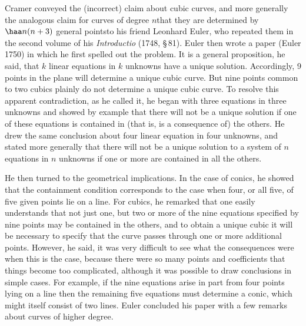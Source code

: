 Cramer conveyed the (incorrect) claim about cubic curves, and more generally the analogous claim for curves of degree $n$\emdash  that they are determined by $\haa n(n+3)$ general points\emdash  to his friend Leonhard Euler, who repeated  them in the second volume of his \emph{Introductio} (1748, \S\,81). Euler then wrote a paper (Euler 1750) in which he first spelled out the problem. It is a general proposition, he said, that $k$ linear equations in $k$ unknowns have a unique solution. Accordingly, 9 points in the plane will determine a unique cubic curve. But nine points common to two cubics plainly do not determine a unique cubic curve. To resolve this apparent contradiction, as he called it, he began with  three equations in three unknowns and showed by example that there will not be a unique solution if one of these equations is contained in (that is, is a consequence of) the others. He drew the same conclusion about four linear equation in four unknowns, and stated more generally that there will not be a unique solution to a system of $n$ equations in $n$ unknowns if one or more are contained in all the others. 

He then turned to the geometrical implications. In the case of conics, he showed that the containment condition corresponds to the case when four, or all five, of five given points lie on a line.  For cubics, he remarked that one easily understands that not just one, but two or more of the nine equations specified by nine points may be contained in the others, and to obtain a unique cubic it will be necessary to specify that the curve passes through one or more additional points.  However, he said, it was very difficult to see what the consequences were when this is the case, because there were so many points and coefficients that things become too complicated, although it was possible to draw conclusions in simple cases. For example, if the nine equations arise in part from four points lying on a line then the remaining five equations must determine a conic, which might itself consist of two lines. Euler concluded his paper with a few remarks about curves of higher degree.


